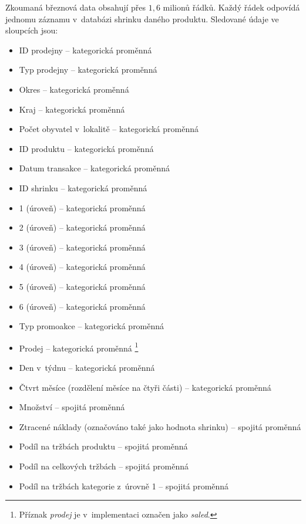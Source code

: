 
Zkoumaná březnová data obsahují přes $1{,6}$ milionů řádků.
Každý řádek odpovídá jednomu záznamu v~databázi shrinku daného produktu. Sledované údaje ve sloupcích jsou: 
\begin{itemize}
    \itemsep-0.34em
    \item ID prodejny -- kategorická proměnná
    \item Typ prodejny -- kategorická proměnná
    \item Okres -- kategorická proměnná
    \item Kraj -- kategorická proměnná
    \item Počet obyvatel v~lokalitě -- kategorická proměnná
    \item ID produktu -- kategorická proměnná
    \item Datum transakce -- kategorická proměnná
    \item ID shrinku -- kategorická proměnná
    \item 1 (úroveň) -- kategorická proměnná
    \item 2 (úroveň) -- kategorická proměnná
    \item 3 (úroveň) -- kategorická proměnná
    \item 4 (úroveň) -- kategorická proměnná
    \item 5 (úroveň) -- kategorická proměnná
    \item 6 (úroveň) -- kategorická proměnná
    \item Typ promoakce -- kategorická proměnná
    \item Prodej -- kategorická proměnná \footnote{Příznak \emph{prodej} je v~implementaci označen jako \emph{saled}.}
    \item Den v~týdnu -- kategorická proměnná
    \item Čtvrt měsíce (rozdělení měsíce na čtyři části) -- kategorická proměnná
    \item Množství -- spojitá proměnná
    \item Ztracené náklady (označováno také jako hodnota shrinku) -- spojitá proměnná
    \item Podíl na tržbách produktu -- spojitá proměnná
    \item Podíl na celkových tržbách -- spojitá proměnná
    \item Podíl na tržbách kategorie z~úrovně 1 -- spojitá proměnná
\end{itemize}

